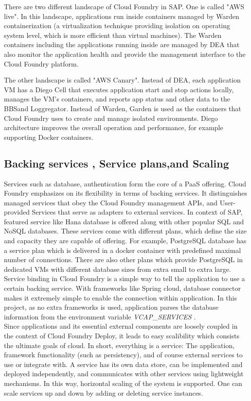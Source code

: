 There are two different landscape of Cloud Foundry in SAP. One is called "AWS live". In this landscape, applications run inside containers managed by Warden containerization (a virtualization technique providing isolation on operating system level, which is more efficient than virtual machines). The Warden containers including the applications running inside are managed by \ac{DEA} that also monitor the application health and provide the management interface to the Cloud Foundry platform.

The other landscape is called "AWS Canary". Instead of \ac{DEA}, each application VM has a Diego Cell that executes application start and stop actions locally, manages the VM’s containers, and reports app status and other data to the \ac{BBS}and Loggregator. Instead of Warden, Garden is used as the containers that Cloud Foundry uses to create and manage isolated environments. Diego architecture improves the overall operation and performance, for example supporting Docker containers.

\subsection{ Backing services , Service plans,and Scaling}
Services such as database, authentication form the core of a \ac{PaaS} offering. Cloud Foundry emphasizes on its flexibility in terms of backing services. It distinguishes managed services that obey the Cloud Foundry management APIs, and User-provided Services that serve as adapters to external services. In context of SAP, featured service like Hana database is offered along with other popular SQL and NoSQL databases. These services come with different plans, which define the size and capacity they are capable of offering. For example, PostgreSQL database has a service plan which is delivered in a docker container with predefined maximal number of connections. There are also other plans which provide PostgreSQL in dedicated VMs with different database sizes from extra small to extra large. \\
Service binding in Cloud Foundry is a simple way to tell the application to use a certain backing service. With frameworks like Spring cloud, database connector makes it extremely simple to enable the connection within application. In this project, as no extra frameworks is used, application parses the database information from the environment variable \textit{VCAP\_SERVICES} . \\

Since applications and its essential external components are loosely coupled in the context of Cloud Foundry Deploy, it leads to easy scalibility which consists the ultimate goals of cloud.  In short, everything is a service: The application, framework functionality (such as persistency), and of course external services to use or integrate with. A service has its own data store, can be implemented and deployed independently, and communicates with other services using lightweight mechanisms.  In this way, horizontal scaling of the system is supported. One can scale services up and down by adding or deleting service instances.

